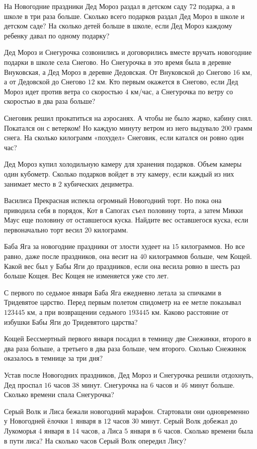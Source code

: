 \begin{class}[number=2]
	\begin{listofex}
		\item На Новогодние праздники Дед Мороз раздал в детском саду \( 72 \) подарка, а в школе в три раза больше. Сколько всего подарков раздал Дед Мороз в школе и детском саде? На сколько детей больше в школе, если Дед Мороз каждому ребенку давал по одному подарку?
		\item Дед Мороз и Снегурочка созвонились и договорились вместе вручать новогодние подарки в школе села Снегово. Но Снегурочка в это время была в деревне Внуковская, а Дед Мороз в деревне Дедовская. От Внуковской до Снегово \( 16 \) км, а от Дедовской до Снегово \( 12 \) км. Кто первым окажется в Снегово, если Дед Мороз идет против ветра со скоростью \( 4 \) км/час, а Снегурочка по ветру со скоростью в два раза больше?
		\item Снеговик решил прокатиться на аэросанях. А чтобы не было жарко, кабину снял. Покатался он с ветерком! Но каждую минуту ветром из него выдувало \( 200 \) грамм снега. На сколько килограмм «похудел» Снеговик, если катался он ровно один час?
		\item Дед Мороз купил холодильную камеру для хранения подарков. Объем камеры один кубометр. Сколько подарков войдет в эту камеру, если каждый из них занимает место в \( 2 \) кубических дециметра.
		\item Василиса Прекрасная испекла огромный Новогодний торт. Но пока она приводила себя в порядок, Кот в Сапогах съел половину торта, а затем Микки Маус еще половину от оставшегося куска. Найдите вес оставшегося куска, если первоначально торт весил \( 20 \) килограмм.
		\item Баба Яга за новогодние праздники от злости худеет на \( 15 \) килограммов. Но все равно, даже после праздников, она весит на \( 40 \) килограммов больше, чем Кощей. Какой вес был у Бабы Яги до праздников, если она весила ровно в шесть раз больше Кощея. Вес Кощея не изменяется уже сто лет.
		\item С первого по седьмое января Баба Яга ежедневно летала за спичками в Тридевятое царство. Перед первым полетом спидометр на ее метле показывал \( 123445 \) км, а при возвращении седьмого \( 193445 \) км. Каково расстояние от избушки Бабы Яги до	Тридевятого царства?
		\item Кощей Бессмертный первого января посадил в темницу две Снежинки, второго в два раза больше, а третьего в два раза больше, чем второго. Сколько Снежинок оказалось в темнице за три дня?
		\item Устав после Новогодних праздников, Дед Мороз и Снегурочка решили отдохнуть, Дед проспал \( 16 \) часов \( 38 \) минут. Снегурочка на \( 6 \) часов и \( 46 \) минут больше. Сколько времени спала Снегурочка?
		\item Серый Волк и Лиса бежали новогодний марафон. Стартовали они одновременно у Новогодней ёлочки \( 1 \) января в \( 12 \) часов \( 30 \) минут. Серый Волк добежал до Лукоморья \( 4 \) января в \( 14 \) часов, а Лиса \( 5 \) января в \( 6 \) часов. Сколько времени была в пути лиса? На сколько часов Серый Волк опередил Лису?
	\end{listofex}
\end{class}
